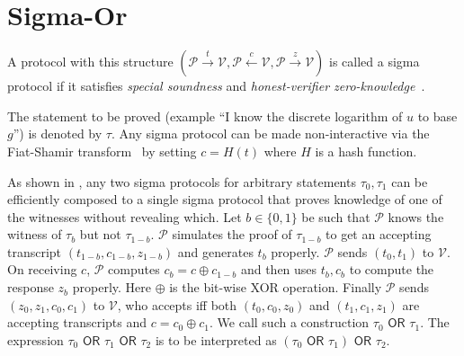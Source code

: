 \documentclass[runningheads]{llncs}
\begin{document}
\section{Sigma-Or}
\label{sigmaor}
A protocol with this structure $(\mathcal{P} \stackrel{t}{\rightarrow}\mathcal{V}, \mathcal{P} \stackrel{c}{\leftarrow}\mathcal{V}, \mathcal{P} \stackrel{z}{\rightarrow}\mathcal{V})$ is called a sigma protocol if it satisfies {\em special soundness} and {\em honest-verifier zero-knowledge}~\cite{Dam10}.

The statement to be proved (example ``I know the discrete logarithm of $u$ to base $g$'') is denoted by $\tau$.
Any sigma protocol can be made non-interactive via the Fiat-Shamir transform~\cite{fiatshamir} by setting $c= H(t)$ where $H$ is a hash function.

As shown in \cite{CDS94}, any two sigma protocols for arbitrary statements $\tau_0, \tau_1$ can be efficiently composed to a single sigma protocol that proves knowledge of one of the witnesses without revealing which. Let $b \in \{0, 1\}$ be such that $\mathcal{P}$ knows the witness of $\tau_{b}$ but not $\tau_{1-b}$.
$\mathcal{P}$ simulates the proof of $\tau_{1-b}$ to get an accepting transcript $(t_{1-b}, c_{1-b}, z_{1-b})$ and generates $t_b$ properly. $\mathcal{P}$ sends $(t_0, t_1)$ to $\mathcal{V}$. On receiving $c$, $\mathcal{P}$ computes $c_b = c \oplus c_{1-b}$ and then uses $t_b, c_b$ to compute the response $z_b$ properly. Here $\oplus$ is the bit-wise XOR operation. Finally $\mathcal{P}$ sends $(z_0, z_1, c_0, c_1)$ to $\mathcal{V}$, who accepts iff both $(t_0, c_0, z_0)$ and $(t_1, c_1, z_1)$ are accepting transcripts and $c = c_0 \oplus c_1$.
We call such a construction $\tau_0 \textsf{ OR } \tau_1$. The expression $\tau_0\textsf{ OR }\tau_1\textsf{ OR }\tau_2$ is to be interpreted as $(\tau_0\textsf{ OR }\tau_1)\textsf{ OR }\tau_2$.
\end{document}
